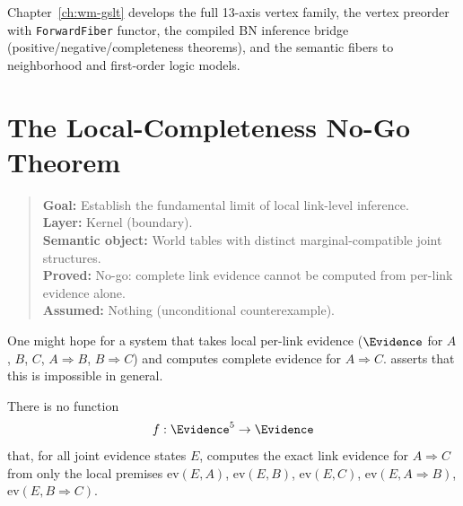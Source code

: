 \documentclass[11pt,openany]{report}
\begin{document}
Chapter~\ref{ch:wm-gslt} develops the full 13-axis vertex family, the
vertex preorder with \texttt{ForwardFiber} functor, the compiled BN
inference bridge (positive/negative/completeness theorems), and the
semantic fibers to neighborhood and first-order logic models.


\chapter{The Local-Completeness No-Go Theorem}
\label{ch:no-go}

\begin{quote}\small
\textbf{Goal:} Establish the fundamental limit of local link-level inference.\\
\textbf{Layer:} Kernel (boundary).\\
\textbf{Semantic object:} World tables with distinct marginal-compatible joint structures.\\
\textbf{Proved:} No-go: complete link evidence cannot be computed from per-link evidence alone.\\
\textbf{Assumed:} Nothing (unconditional counterexample).
\end{quote}

One might hope for a system that takes local per-link evidence
($\Evidence$ for $A$, $B$, $C$, $A \Rightarrow B$, $B \Rightarrow C$)
and computes complete evidence for $A \Rightarrow C$.  \xiPLN{} asserts
that this is impossible in general.

\boundarystart
\begin{theorem}
\label{thm:no-go}
There is no function
\[
  f : \Evidence^5 \to \Evidence
\]
that, for all joint evidence states $E$, computes the exact link evidence
for $A \Rightarrow C$ from only the local premises
$\mathrm{ev}(E, A)$, $\mathrm{ev}(E, B)$, $\mathrm{ev}(E, C)$,
$\mathrm{ev}(E, A \Rightarrow B)$, $\mathrm{ev}(E, B \Rightarrow C)$.
\end{theorem}
\boundaryend
\end{document}
